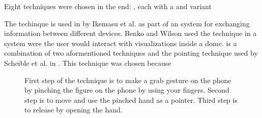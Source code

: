 Eight techniques were chosen in the end: \alltechniques, each with a \push and \pull variant

The \grab techinque is used in  by Ikemasu et al. as part of an system for exchanging information between different devices. Benko and Wilson  used the \grab technique in a system were the user would interact with visualizations inside a dome. \grab is a combination of two aformentioned techniques and the pointing technique used by Scheible et al. in . This technique was chosen because  

\begin{figure}[H]
	\caption{\protect{} First step of the \grab technique is to make a grab gesture on the phone by pinching the figure on the phone by using your fingers. \protect{} Second step is to move and use the pinched hand as a pointer. \protect{} Third step is to release by opening the hand.}
	\label{fig:pinchTechnique}
\end{figure}

